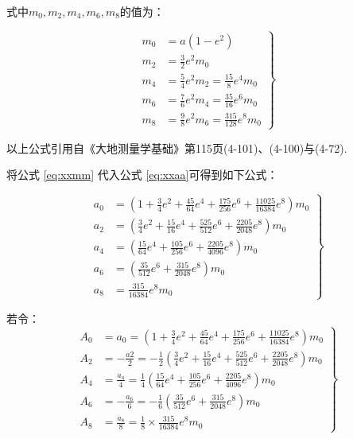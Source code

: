 \begin{enumerate}
式中$m_0, m_2, m_4, m_6, m_8$的值为：

\begin{equation}
\label{eq:xxmm}
\left . 
\begin{aligned}
m_0 &= a(1-e^2) \\
m_2 &= \frac{3}{2}e^2 m_0  \\
m_4 &= \frac{5}{4}e^2 m_2  = \frac{15}{8} e^4 m_0 \\
m_6 &= \frac{7}{6}e^2 m_4   = \frac{35}{16} e^6 m_0 \\
m_8 &= \frac{9}{8}e^2 m_6 = \frac{315}{128} e^8 m_0
\end{aligned} 
\right \}
\end{equation}

以上公式引用自《大地测量学基础》第115页(4-101)、(4-100)与(4-72).

将公式 \ref{eq:xxmm} 代入公式  \ref{eq:xxaa}可得到如下公式：

 \begin{equation}
\label{eq:xxaamm}
\left  . \begin{aligned}
a_0 &=(1 + \frac{3}{4} e^2 + \frac{45}{64} e^4 + \frac{175}{256} e^6 + \frac{11025}{16384} e^8) m_0  \\
a_2 &=(\frac{3}{4} e^2 + \frac{15}{16} e^4 + \frac{525}{512} e^6 + \frac{2205}{2048} e^8) m_0  \\
a_4 &=(\frac{15}{64} e^4 + \frac{105}{256} e^6 + \frac{2205}{4096} e^8) m_0  \\
a_6 &=(\frac{35}{512} e^6 + \frac{315}{2048} e^8) m_0  \\
a_8 &= \frac{315}{16384} e^8 m_0
\end{aligned} \right \}
\end{equation}

若令：
\begin{equation}
\label{eq:xxAAA}
\left  . \begin{aligned}
A_0 &=a_0 = (1 + \frac{3}{4} e^2 + \frac{45}{64} e^4 + \frac{175}{256} e^6 + \frac{11025}{16384} e^8) m_0  \\
A_2 &=-\frac{a2}{2} =-\frac{1}{2}  (\frac{3}{4} e^2 + \frac{15}{16} e^4 + \frac{525}{512} e^6 + \frac{2205}{2048} e^8) m_0  \\
A_4 &=\frac{a_4}{4}=\frac{1}{4} (\frac{15}{64} e^4 + \frac{105}{256} e^6 + \frac{2205}{4096} e^8) m_0  \\
A_6 &=-\frac{a_6}{6}=-\frac{1}{6} (\frac{35}{512} e^6 + \frac{315}{2048} e^8) m_0  \\
A_8 &= \frac{a_8}{8}=\frac{1}{8} \times \frac{315}{16384} e^8 m_0
\end{aligned} \right \}
\end{equation}


\end{enumerate}
